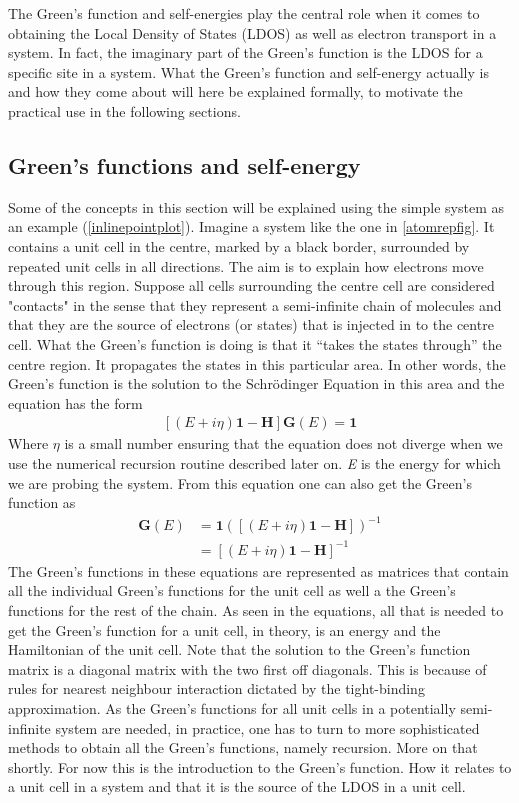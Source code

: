 The Green's function and self-energies play the central role when it comes to obtaining the Local Density of States (LDOS) as well as electron transport in a system. In fact, the imaginary part of the Green's function is the LDOS for a specific site in a system. What the Green's function and self-energy actually is and how they come about will here be explained formally, to motivate the practical use in the following sections.
\subsection{Green's functions and self-energy}\label{greensandself}
Some of the concepts in this section will be explained using the simple system as an example (\cref{inlinepointplot}). Imagine a system like the one in \cref{atomrepfig}. It contains a unit cell in the centre, marked by a black border, surrounded by repeated unit cells in all directions. The aim is to explain how electrons move through this region. Suppose all cells surrounding the centre cell are considered "contacts" in the sense that they represent a semi-infinite chain of molecules and that they are the source of electrons (or states) that is injected in to the centre cell. What the Green's function is doing is that it ``takes the states through'' the centre region. It propagates the states in this particular area. In other words, the Green's function is the solution to the Schr\"{o}dinger Equation in this area and the equation has the form
\begin{align}\label{Greensunsolved}
	[(E+i\eta)\mathbf{1}-\mathbf{H}]\mathbf{G}(E) = \mathbf{1}
\end{align}
Where \(\eta\) is a small number ensuring that the equation does not diverge when we use the numerical recursion routine described later on. \textit{E} is the energy for which we are probing the system.
From this equation one can also get the Green's function as
\begin{align}\label{Greenssolved}
	\mathbf{G}(E) & = \mathbf{1}([(E+i\eta)\mathbf{1}-\mathbf{H}])^{-1} \\
	              & = [(E+i\eta)\mathbf{1}-\mathbf{H}]^{-1}
\end{align}
The Green's functions in these equations are represented as matrices that contain all the individual Green's functions for the unit cell as well a the Green's functions for the rest of the chain. As seen in the equations, all that is needed to get the Green's function for a unit cell, in theory, is an energy and the Hamiltonian of the unit cell. Note that the solution to the Green's function matrix is a diagonal matrix with the two first off diagonals. This is because of rules for nearest neighbour interaction dictated by the tight-binding approximation. As the Green's functions for all unit cells in a potentially semi-infinite system are needed, in practice, one has to turn to more sophisticated methods to obtain all the Green's functions, namely recursion. More on that shortly. For now this is the introduction to the Green's function. How it relates to a unit cell in a system and that it is the source of the LDOS in a unit cell.\\
